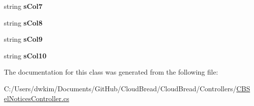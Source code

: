 \begin{DoxyCompactItemize}
\item 
string {\bfseries s\+Col7}\hypertarget{class_cloud_bread_1_1_controllers_1_1_c_b_sel_notices_controller_1_1_model_aeeaa8564b8510384f450091465d8319b}{}\label{class_cloud_bread_1_1_controllers_1_1_c_b_sel_notices_controller_1_1_model_aeeaa8564b8510384f450091465d8319b}

\item 
string {\bfseries s\+Col8}\hypertarget{class_cloud_bread_1_1_controllers_1_1_c_b_sel_notices_controller_1_1_model_ab098018cfc60c72d661eac3874141e3a}{}\label{class_cloud_bread_1_1_controllers_1_1_c_b_sel_notices_controller_1_1_model_ab098018cfc60c72d661eac3874141e3a}

\item 
string {\bfseries s\+Col9}\hypertarget{class_cloud_bread_1_1_controllers_1_1_c_b_sel_notices_controller_1_1_model_a68f11b47d86ff0c7e0d75bc070290885}{}\label{class_cloud_bread_1_1_controllers_1_1_c_b_sel_notices_controller_1_1_model_a68f11b47d86ff0c7e0d75bc070290885}

\item 
string {\bfseries s\+Col10}\hypertarget{class_cloud_bread_1_1_controllers_1_1_c_b_sel_notices_controller_1_1_model_a344b3c659fd15c59246a0009b72408e5}{}\label{class_cloud_bread_1_1_controllers_1_1_c_b_sel_notices_controller_1_1_model_a344b3c659fd15c59246a0009b72408e5}

\end{DoxyCompactItemize}


The documentation for this class was generated from the following file\+:\begin{DoxyCompactItemize}
\item 
C\+:/\+Users/dwkim/\+Documents/\+Git\+Hub/\+Cloud\+Bread/\+Cloud\+Bread/\+Controllers/\hyperlink{_c_b_sel_notices_controller_8cs}{C\+B\+Sel\+Notices\+Controller.\+cs}\end{DoxyCompactItemize}

